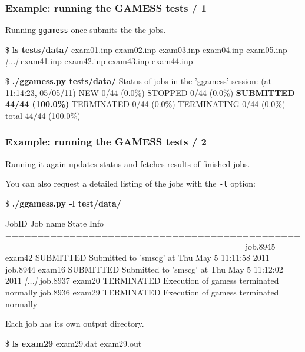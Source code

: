 \documentclass[english,serif,mathserif,xcolor=pdftex,dvipsnames,table]{beamer}
\begin{document}
\begin{frame}[fragile]
  \frametitle{Example: running the GAMESS tests / 1}
  Running \texttt{ggamess} once submits the the jobs.

  \begin{scriptsize}
\begin{semiverbatim}
\$ \textbf{ls tests/data/}
exam01.inp  exam02.inp  exam03.inp  exam04.inp  exam05.inp
\emph{[...]}
exam41.inp  exam42.inp  exam43.inp  exam44.inp 

\$ \textbf{./ggamess.py tests/data/}
Status of jobs in the 'ggamess' session: (at 11:14:23, 05/05/11)
        NEW   0/44     (0.0\%)
    STOPPED   0/44     (0.0\%)
  \textbf{SUBMITTED   44/44   (100.0\%)}
 TERMINATED   0/44     (0.0\%)
TERMINATING   0/44     (0.0\%)
      total   44/44   (100.0\%)
\end{semiverbatim}
  \end{scriptsize}
\end{frame}

\begin{frame}[fragile]
  \frametitle{Example: running the GAMESS tests / 2}
  Running it again updates status and fetches results of finished jobs.

  \+
  You can also request a detailed listing of the jobs with the
  \texttt{-l} option:
  \begin{scriptsize}
    \begin{semiverbatim}
\$ \textbf{./ggamess.py -l test/data/}
\begin{tiny}
 JobID     Job name     State                                    Info                               
===================================================================================
job.8945   exam42     SUBMITTED    Submitted to 'smscg' at Thu May  5 11:11:58 2011                 
job.8944   exam16     SUBMITTED    Submitted to 'smscg' at Thu May  5 11:12:02 2011                 
\emph{[...]}
job.8937   exam20     TERMINATED   Execution of gamess terminated normally
job.8936   exam29     TERMINATED   Execution of gamess terminated normally
\end{tiny}
\end{semiverbatim}
    \end{scriptsize}
    
  Each job has its own output directory.
  \begin{scriptsize}
\begin{semiverbatim}
\$ \textbf{ls exam29}
exam29.dat  exam29.out
\end{semiverbatim}
  \end{scriptsize}
\end{frame}
\end{document}

